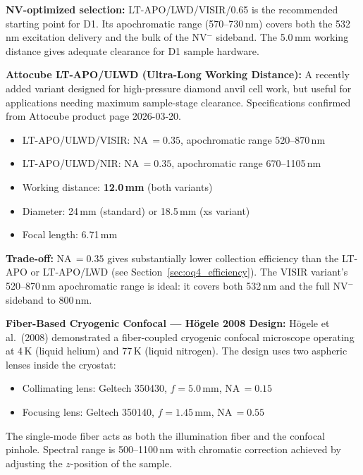 \textbf{NV-optimized selection:} LT-APO/LWD/VISIR/0.65 is the recommended
starting point for D1. Its apochromatic range (570--730\,nm) covers both
the 532\,nm excitation delivery and the bulk of the NV$^-$ sideband.
The 5.0\,mm working distance gives adequate clearance for D1 sample hardware.

\textbf{Attocube LT-APO/ULWD (Ultra-Long Working Distance):}
A recently added variant designed for high-pressure diamond anvil cell work,
but useful for applications needing maximum sample-stage clearance.
Specifications confirmed from Attocube product page 2026-03-20.\cite{AttocubeULWD_web}

\begin{itemize}
  \item LT-APO/ULWD/VISIR: NA\,$= 0.35$, apochromatic range 520--870\,nm
  \item LT-APO/ULWD/NIR: NA\,$= 0.35$, apochromatic range 670--1105\,nm
  \item Working distance: \textbf{12.0\,mm} (both variants)
  \item Diameter: 24\,mm (standard) or 18.5\,mm (xs variant)
  \item Focal length: 6.71\,mm \cite{AttocubeULWD_web}
\end{itemize}

\textbf{Trade-off:} NA\,$= 0.35$ gives substantially lower collection
efficiency than the LT-APO or LT-APO/LWD (see Section~\ref{sec:oq4_efficiency}).
The VISIR variant's 520--870\,nm apochromatic range is ideal: it
covers both 532\,nm and the full NV$^-$ sideband to 800\,nm.

\textbf{Fiber-Based Cryogenic Confocal --- H\"{o}gele 2008 Design:}
H\"{o}gele et al.\ (2008) demonstrated a fiber-coupled cryogenic confocal
microscope operating at 4\,K (liquid helium) and 77\,K (liquid nitrogen).\cite{Hogele2008}
The design uses two aspheric lenses inside the cryostat:
\begin{itemize}
  \item Collimating lens: Geltech 350430, $f = 5.0$\,mm, NA\,$= 0.15$ \cite{Hogele2008}
  \item Focusing lens: Geltech 350140, $f = 1.45$\,mm, NA\,$= 0.55$ \cite{Hogele2008}
\end{itemize}
The single-mode fiber acts as both the illumination fiber and the confocal
pinhole.\cite{Hogele2008}
Spectral range is 500--1100\,nm with chromatic correction achieved by adjusting
the $z$-position of the sample.\cite{Hogele2008}

